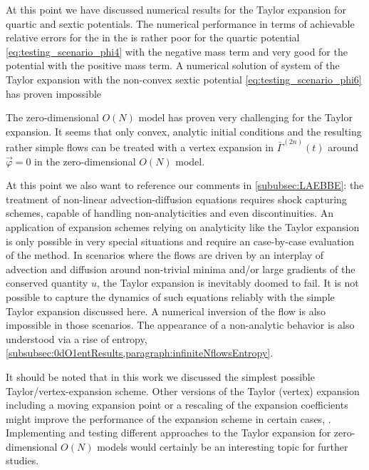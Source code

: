 At this point we have discussed numerical results for the \frg{} Taylor expansion for quartic and sextic potentials.
The numerical performance in terms of achievable relative errors for the \nptFunctions{} in the \ir{} is rather poor for the quartic potential \eqref{eq:testing_scenario_phi4} with the negative mass term and very good for the potential with the positive mass term.
A numerical solution of \ode{} system of the Taylor expansion with the non-convex sextic potential \eqref{eq:testing_scenario_phi6} has proven impossible 

The zero-dimensional $O(N)$ model has proven very challenging for the Taylor expansion.
It seems that only convex, analytic \uv{} initial conditions and the resulting rather simple \frg{} flows can be treated with a vertex expansion in $\bar{\Gamma}^{(2n)}(t)$ around $\vec{\varphi} = 0$ in the zero-dimensional $O(N)$ model.

At this point we also want to reference our comments in \cref{sububsec:LAEBBE}: the treatment of non-linear advection-diffusion equations requires \apriori{} shock capturing schemes, capable of handling non-analyticities and even discontinuities.
An application of expansion schemes relying on analyticity like the Taylor expansion is only possible in very special situations and require an \aposteriori{} case-by-case evaluation of the method.
In scenarios where the \frg{} flows are driven by an interplay of advection and diffusion around non-trivial minima and/or large gradients of the conserved quantity $u$, the Taylor expansion is inevitably doomed to fail.
It is not possible to capture the dynamics of such equations reliably with the simple Taylor expansion discussed here.
A numerical inversion of the \grg{} flow is also impossible in those scenarios.
The appearance of a non-analytic behavior is also understood via a rise of entropy, \cf{} \cref{subsubsec:0dO1entResults,paragraph:infiniteNflowsEntropy}.

It should be noted that in this work we discussed the simplest possible Taylor/vertex-expansion scheme.
Other versions of the \frg{} Taylor (vertex) expansion including a moving expansion point or a rescaling of the expansion coefficients might improve the performance of the expansion scheme in certain cases, \cf{} .
Implementing and testing different approaches to the Taylor expansion for zero-dimensional $O(N)$ models would certainly be an interesting topic for further studies.